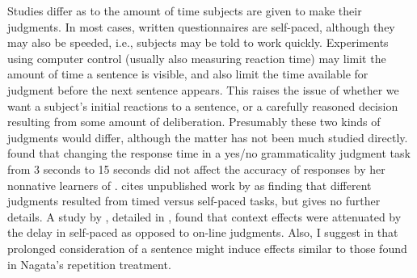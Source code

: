 Studies differ as to the amount of time subjects are given to make their judgments. In most cases, written questionnaires are self-paced, although they may also be speeded, i.e., subjects may be told to work quickly. Experiments using computer control (usually also measuring reaction time) may limit the amount of time a sentence is visible, and also limit the time available for judgment before the next sentence appears. This raises the issue of whether we want a subject's initial reactions to a sentence, or a carefully reasoned decision resulting from some amount of deliberation. Presumably these two kinds of judgments would differ, although the matter has not been much studied directly. \citet{Bialystok1979} found that changing the response time in a yes/no grammaticality judgment task from 3 seconds to 15 seconds did not affect the accuracy of responses by her nonnative learners of . \citet{Greenbaum1977c} cites unpublished work by  \citet{LegumEtAl1974} as finding that different judgments resulted from timed versus self-paced tasks, but gives no further details. A study by \citet{WarnerEtAl1987}, detailed in , found that context effects were attenuated by the delay in self-paced as opposed to on-line judgments. Also, I suggest in  that prolonged consideration of a sentence might induce effects similar to those found in Nagata's repetition treatment.

